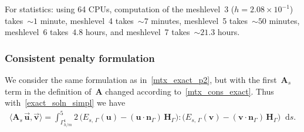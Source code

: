 \documentclass[12pt]{article}
\newcommand{\vect}[1]{\boldsymbol{\mathbf{#1}}}
\newcommand*\diff{\mathop{}\!\mathrm{d}}
\begin{document}
For statistics: using 64 CPUs, computation of the meshlevel~3 ($h = 2.08\times10^{-1}$) takes~${\sim}1$ minute, meshlevel~4 takes~${\sim}7$ minutes, meshlevel~5 takes~${\sim}50$ minutes, meshlevel~6 takes~$4.8$ hours, and meshlevel~7 takes~${\sim}21.3$ hours.

\subsubsection{Consistent penalty formulation}

%
%
We consider the same formulation as in~\eqref{mtx_exact_p2}, but with the first~$\vect A_s$ term in the definition of~$\vect A$ changed according to~\eqref{mtx_cons_exact}. Thus with~\eqref{exact_soln_simpl} we have
\begin{align}\label{mtx_exact_p2_cons}
	\langle \vect A_s\,\vec{\vect u}, \vec{\vect v} \rangle = \int^5_{\Gamma_{h/m}^1} 2\,\big( E_{s,\,\Gamma}(\vect u) - (\vect u\cdot\vect n_{\Gamma})\,\vect H_{\Gamma} \big) : \big( E_{s,\,\Gamma}(\vect v) - (\vect v\cdot\vect n_{\Gamma})\,\vect H_{\Gamma} \big) \diff{s}.
\end{align}
\end{document}
